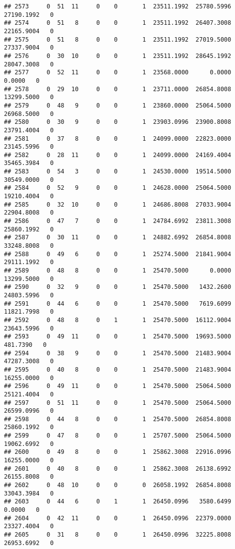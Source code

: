 \documentclass[
]{article}
\begin{document}
\begin{enumerate}
\begin{verbatim}
## 2573     0  51  11     0    0       1  23511.1992  25780.5996  27190.1992   0
## 2574     0  51   8     0    0       1  23511.1992  26407.3008  22165.9004   0
## 2575     0  51   8     0    0       1  23511.1992  27019.5000  27337.9004   0
## 2576     0  30  10     0    0       1  23511.1992  28645.1992  28047.3008   0
## 2577     0  52  11     0    0       1  23568.0000      0.0000      0.0000   0
## 2578     0  29  10     0    0       1  23711.0000  26854.8008  13299.5000   0
## 2579     0  48   9     0    0       1  23860.0000  25064.5000  26968.5000   0
## 2580     0  30   9     0    0       1  23903.0996  23900.8008  23791.4004   0
## 2581     0  37   8     0    0       1  24099.0000  22823.0000  23145.5996   0
## 2582     0  28  11     0    0       1  24099.0000  24169.4004  35465.3984   0
## 2583     0  54   3     0    0       1  24530.0000  19514.5000  30549.0000   0
## 2584     0  52   9     0    0       1  24628.0000  25064.5000  19210.4004   0
## 2585     0  32  10     0    0       1  24686.8008  27033.9004  22904.8008   0
## 2586     0  47   7     0    0       1  24784.6992  23811.3008  25860.1992   0
## 2587     0  30  11     0    0       1  24882.6992  26854.8008  33248.8008   0
## 2588     0  49   6     0    0       1  25274.5000  21841.9004  29111.1992   0
## 2589     0  48   8     0    0       1  25470.5000      0.0000  13299.5000   0
## 2590     0  32   9     0    0       1  25470.5000   1432.2600  24803.5996   0
## 2591     0  44   6     0    0       1  25470.5000   7619.6099  11821.7998   0
## 2592     0  48   8     0    1       1  25470.5000  16112.9004  23643.5996   0
## 2593     0  49  11     0    0       1  25470.5000  19693.5000    481.7390   0
## 2594     0  38   9     0    0       1  25470.5000  21483.9004  47287.3008   0
## 2595     0  40   8     0    0       1  25470.5000  21483.9004  16255.0000   0
## 2596     0  49  11     0    0       1  25470.5000  25064.5000  25121.4004   0
## 2597     0  51  11     0    0       1  25470.5000  25064.5000  26599.0996   0
## 2598     0  44   8     0    0       1  25470.5000  26854.8008  25860.1992   0
## 2599     0  47   8     0    0       1  25707.5000  25064.5000  19062.6992   0
## 2600     0  49   8     0    0       1  25862.3008  22916.0996  16255.0000   0
## 2601     0  40   8     0    0       1  25862.3008  26138.6992  26155.8008   0
## 2602     0  48  10     0    0       0  26058.1992  26854.8008  33043.3984   0
## 2603     0  44   6     0    1       1  26450.0996   3580.6499      0.0000   0
## 2604     0  42  11     0    0       1  26450.0996  22379.0000  23327.4004   0
## 2605     0  31   8     0    0       1  26450.0996  32225.8008  26953.6992   0

\end{verbatim}
\end{enumerate}
\end{document}
